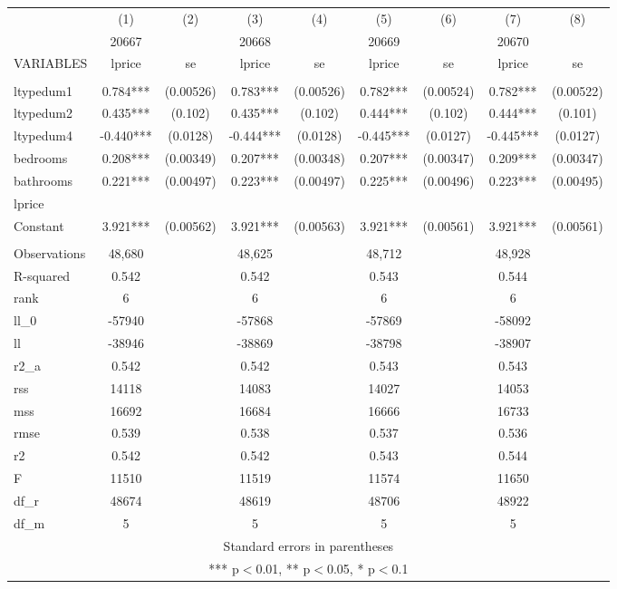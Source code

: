\documentclass[]{article}
\begin{document}
\begin{tabular}{lcccccccc} \hline
 & (1) & (2) & (3) & (4) & (5) & (6) & (7) & (8) \\
 & 20667 &  & 20668 &  & 20669 &  & 20670 &  \\
VARIABLES & lprice & se & lprice & se & lprice & se & lprice & se \\ \hline
 &  &  &  &  &  &  &  &  \\
ltypedum1 & 0.784*** & (0.00526) & 0.783*** & (0.00526) & 0.782*** & (0.00524) & 0.782*** & (0.00522) \\
ltypedum2 & 0.435*** & (0.102) & 0.435*** & (0.102) & 0.444*** & (0.102) & 0.444*** & (0.101) \\
ltypedum4 & -0.440*** & (0.0128) & -0.444*** & (0.0128) & -0.445*** & (0.0127) & -0.445*** & (0.0127) \\
bedrooms & 0.208*** & (0.00349) & 0.207*** & (0.00348) & 0.207*** & (0.00347) & 0.209*** & (0.00347) \\
bathrooms & 0.221*** & (0.00497) & 0.223*** & (0.00497) & 0.225*** & (0.00496) & 0.223*** & (0.00495) \\
lprice &  &  &  &  &  &  &  &  \\
Constant & 3.921*** & (0.00562) & 3.921*** & (0.00563) & 3.921*** & (0.00561) & 3.921*** & (0.00561) \\
 &  &  &  &  &  &  &  &  \\
Observations & 48,680 &  & 48,625 &  & 48,712 &  & 48,928 &  \\
R-squared & 0.542 &  & 0.542 &  & 0.543 &  & 0.544 &  \\
rank & 6 &  & 6 &  & 6 &  & 6 &  \\
ll\_0 & -57940 &  & -57868 &  & -57869 &  & -58092 &  \\
ll & -38946 &  & -38869 &  & -38798 &  & -38907 &  \\
r2\_a & 0.542 &  & 0.542 &  & 0.543 &  & 0.543 &  \\
rss & 14118 &  & 14083 &  & 14027 &  & 14053 &  \\
mss & 16692 &  & 16684 &  & 16666 &  & 16733 &  \\
rmse & 0.539 &  & 0.538 &  & 0.537 &  & 0.536 &  \\
r2 & 0.542 &  & 0.542 &  & 0.543 &  & 0.544 &  \\
F & 11510 &  & 11519 &  & 11574 &  & 11650 &  \\
df\_r & 48674 &  & 48619 &  & 48706 &  & 48922 &  \\
 df\_m & 5 &  & 5 &  & 5 &  & 5 &  \\ \hline
\multicolumn{9}{c}{ Standard errors in parentheses} \\
\multicolumn{9}{c}{ *** p$<$0.01, ** p$<$0.05, * p$<$0.1} \\
\end{tabular}
\end{document}
